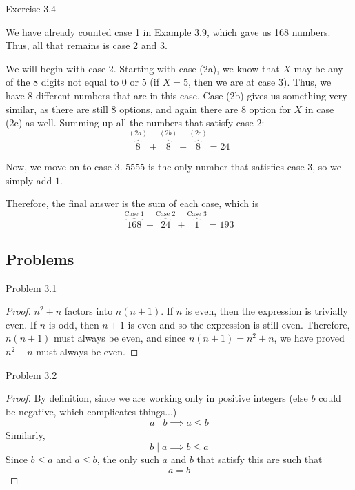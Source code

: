 \begin{sol}{Exercise 3.4}
\begin{center}
{
}
\end{center}
We have already counted case 1 in Example 3.9, which gave us 168 numbers. Thus, all that remains is case 2 and 3. 

We will begin with case 2. Starting with case (2a), we know that $X$ may be any of the 8 digits not equal to $0$ or $5$ (if $X = 5$, then we are at case 3). Thus, we have 8 different numbers that are in this case. Case (2b) gives us something very similar, as there are still 8 options, and again there are 8 option for $X$ in case (2c) as well. Summing up all the numbers that satisfy case 2:
\[
\overbrace{8}^{(2a)} + \overbrace{8}^{(2b)} + \overbrace{8}^{(2c)} = 24
\]

Now, we move on to case 3. $5555$ is the only number that satisfies case 3, so we simply add $1$.

Therefore, the final answer is the sum of each case, which is
\[
\overbrace{168}^{\text{Case 1}} + \overbrace{24}^{\text{Case 2}} + \overbrace{1}^{\text{Case 3}} = \boxed{193}
\]
\end{sol}


\subsection{Problems} %
\begin{sol}{Problem 3.1}
\begin{proof}
$n^2 + n$ factors into $n(n+1)$. If $n$ is even, then the expression is trivially even. If $n$ is odd, then $n+1$ is even and so the expression is still even. Therefore, $n(n+1)$ must always be even, and since $n(n+1) = n^2 + n$, we have proved $n^2 + n$ must always be even.
\end{proof}
\end{sol}

\begin{sol}{Problem 3.2}
\begin{proof}
By definition, since we are working only in positive integers (else $b$ could be negative, which complicates things...)
\[
a \mid b \implies a \leq b
\]
Similarly,
\[
b \mid a \implies b \leq a
\]
Since $b \leq a$ and $a \leq b$, the only such $a$ and $b$ that satisfy this are such that
\[
a = b
\]
\end{proof}
\end{sol}

